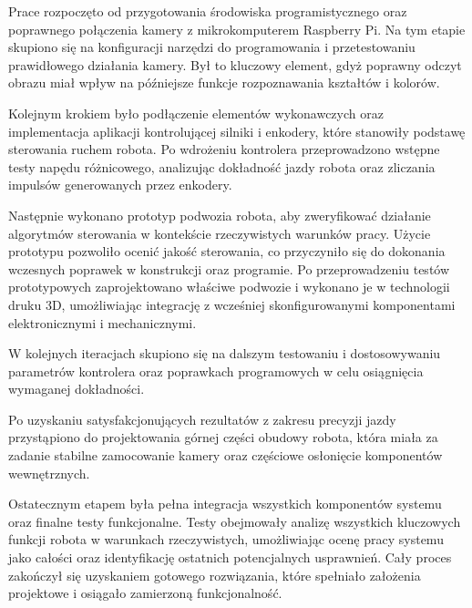 \hspace*{1cm}

Prace rozpoczęto od przygotowania środowiska programistycznego oraz poprawnego połączenia kamery z mikrokomputerem Raspberry Pi. Na tym etapie skupiono się na konfiguracji narzędzi do programowania i przetestowaniu prawidłowego działania kamery. Był to kluczowy element, gdyż poprawny odczyt obrazu miał wpływ na późniejsze funkcje rozpoznawania kształtów i kolorów.

Kolejnym krokiem było podłączenie elementów wykonawczych oraz implementacja aplikacji kontrolującej silniki i enkodery, które stanowiły podstawę sterowania ruchem robota. Po wdrożeniu kontrolera przeprowadzono wstępne testy napędu różnicowego, analizując dokładność jazdy robota oraz zliczania impulsów generowanych przez enkodery. 

Następnie wykonano prototyp podwozia robota, aby zweryfikować działanie algorytmów sterowania w kontekście rzeczywistych warunków pracy. Użycie prototypu pozwoliło ocenić jakość sterowania, co przyczyniło się do dokonania wczesnych poprawek w konstrukcji oraz programie. Po przeprowadzeniu testów prototypowych zaprojektowano właściwe podwozie i wykonano je w technologii druku 3D, umożliwiając integrację z wcześniej skonfigurowanymi komponentami elektronicznymi i mechanicznymi.

W kolejnych iteracjach skupiono się na dalszym testowaniu i dostosowywaniu parametrów kontrolera oraz poprawkach programowych w celu osiągnięcia wymaganej dokładności. 

Po uzyskaniu satysfakcjonujących rezultatów z zakresu precyzji jazdy przystąpiono do projektowania górnej części obudowy robota, która miała za zadanie stabilne zamocowanie kamery oraz częściowe osłonięcie komponentów wewnętrznych. 

Ostatecznym etapem była pełna integracja wszystkich komponentów systemu oraz finalne testy funkcjonalne. Testy obejmowały analizę wszystkich kluczowych funkcji robota w warunkach rzeczywistych, umożliwiając ocenę pracy systemu jako całości oraz identyfikację ostatnich potencjalnych usprawnień. Cały proces zakończył się uzyskaniem gotowego rozwiązania, które spełniało założenia projektowe i osiągało zamierzoną funkcjonalność.
